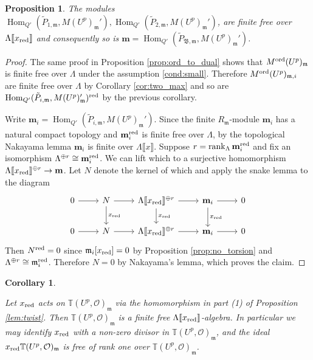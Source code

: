 \documentclass[leqno]{amsart}
\newtheorem{prop}[thm]{Proposition}
\newtheorem{cor}[thm]{Corollary}
\theoremstyle{definition}
\theoremstyle{remark}
\newcommand{\oo}{\mathcal{O}}
\DeclareMathOperator{\Hom}{Hom}
\DeclareMathOperator{\rank}{rank}
\newcommand{\fm}{\mathfrak{m}}
\newcommand{\B}{\mathfrak B} %
\newcommand{\red}{\textnormal{red}}
\newcommand{\xx}{x_\textnormal{red}}
\newcommand{\TT}{\mathbb{T}} %
\newcommand{\ord}{\textnormal{ord}} %
\begin{document}
\begin{prop}\label{prop:Hecke_finite}
The modules
$\Hom_{Q'}(\tilde{P}_{1,\fm},M(U^p)_{\fm}'),
\Hom_{Q'}(\tilde{P}_{2,\fm},M(U^p)_{\fm}')$,
are finite free over 
$\Lambda\llbracket \xx\rrbracket$
and consequently so is 
$\mathbf{m}=
\Hom_{Q'}(\tilde{P}_{\B,\fm},M(U^p)_{\fm}')$.
\end{prop}
\begin{proof}
    The same proof in Proposition \ref{prop:ord_to_dual}
    shows that $M^{\ord}(U^p)_\fm$ is finite free over $\Lambda$
    under the assumption \eqref{cond:small}.
    Therefore $M^{\ord}(U^p)_{\fm,i}$ are finite free over $\Lambda$
    by Corollary \ref{cor:two_max} and so are 
    $\Hom_{Q'}(\tilde{P}_{i,\fm},M(U^p)_{\fm}')^{\red}$
    by the previous corollary.

    Write $\mathbf{m}_i=\Hom_{Q'}(\tilde{P}_{i,\fm},M(U^p)_{\fm}')$.
    Since the finite $R_\fm$-module
    $\mathbf{m}_i$ has a natural compact topology
    and $\mathbf{m}_i^\red$ is finite free over $\Lambda$,
	by the topological Nakayama lemma
	$\mathbf{m}_i$ is finite over $\Lambda\llbracket x\rrbracket$.
    Suppose $r=\rank_{\Lambda}\mathbf{m}_i^\red$
    and fix an isomorphism $\Lambda^{\oplus r}\cong \mathbf{m}_i^\red$.
    We can lift which to a surjective homomorphism
    $\Lambda\llbracket \xx\rrbracket^{\oplus r}\to\mathbf{m}$.
    Let $N$ denote the kernel of which and 
    apply the snake lemma to the diagram
    \[
    \begin{tikzcd}
    0\arrow[r]& 
    N\arrow[r]\arrow[d,"\xx"]&
    \Lambda\llbracket \xx\rrbracket^{\oplus r}\arrow[r]\arrow[d,"\xx"]&
    \mathbf{m}_i\arrow[r]\arrow[d,"\xx"] &0\\
    0\arrow[r]& 
    N\arrow[r]&
    \Lambda\llbracket \xx\rrbracket^{\oplus r}\arrow[r]&
    \mathbf{m}_i\arrow[r] &0
    \end{tikzcd}
    \]
    Then $N^\red=0$ since $\fm_i[\xx]=0$ by
    Proposition \ref{prop:no_torsion} and 
    $\Lambda^{\oplus r}\cong \fm_i^\red$.
    Therefore $N=0$ by Nakayama's lemma, which proves the claim.
\end{proof}



\begin{cor}\label{cor:Hecke_ff}

Let $\xx$ acts on $\TT(U^p,\oo)_\fm$ via 
the homomorphism in part (1) of Proposition \ref{lem:twist}.
Then $\TT(U^p,\oo)_\fm$ is a finite free 
$\Lambda\llbracket\xx\rrbracket$-algebra.
In particular we may identify $\xx$ with
a non-zero divisor in $\TT(U^p,\oo)_\fm$,
and the ideal $\xx\TT(U^p,\oo)_\fm$
is free of rank one over $\TT(U^p,\oo)_\fm$.

\end{cor}
\end{document}
